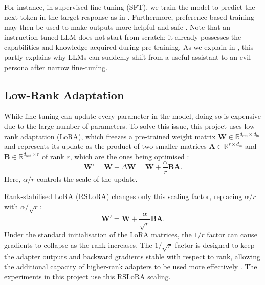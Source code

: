 For instance, in supervised fine-tuning (SFT), we train the model to predict the next token in the target response as in . Furthermore, preference-based training may then be used to make outputs more helpful and safe \citep{ouyang2022instructgpt}. Note that an instruction-tuned LLM does not start from scratch; it already possesses the capabilities and knowledge acquired during pre-training. As we explain in , this partly explains why LLMs can suddenly shift from a useful assistant to an evil persona after narrow fine-tuning. 

\subsection{Low-Rank Adaptation}
\label{subsec:lora}
While fine-tuning can update every parameter in the model, doing so is expensive due to the large number of parameters. To solve this issue, this project uses low-rank adaptation (LoRA), which freezes a pre-trained weight matrix $\mathbf{W} \in \mathbb{R}^{d_{\mathrm{out}} \times d_{\mathrm{in}}}$ and represents its update as the product of two smaller matrices $\mathbf{A} \in \mathbb{R}^{r \times d_{\mathrm{in}}}$ and $\mathbf{B} \in \mathbb{R}^{d_{\mathrm{out}} \times r}$ of rank $r$, which are the ones being optimised \citep{hu2022lora}:
\begin{equation}
    \mathbf{W}' = \mathbf{W} + \Delta\mathbf{W}
    = \mathbf{W} + \frac{\alpha}{r}\mathbf{B}\mathbf{A}.
    \label{eq:lora_update}
\end{equation}
Here, $\alpha/r$ controls the scale of the update.

Rank-stabilised LoRA (RSLoRA) changes only this scaling factor, replacing $\alpha/r$ with $\alpha/\sqrt{r}$:
\begin{equation}
    \mathbf{W}' = \mathbf{W} + \frac{\alpha}{\sqrt{r}}\mathbf{B}\mathbf{A}.
    \label{eq:rslora_update}
\end{equation}
Under the standard initialisation of the LoRA matrices, the $1/r$ factor can cause gradients to collapse as the rank increases. The $1/\sqrt{r}$ factor is designed to keep the adapter outputs and backward gradients stable with respect to rank, allowing the additional capacity of higher-rank adapters to be used more effectively \citep{kalajdzievski2023rank}. The experiments in this project use this RSLoRA scaling.

